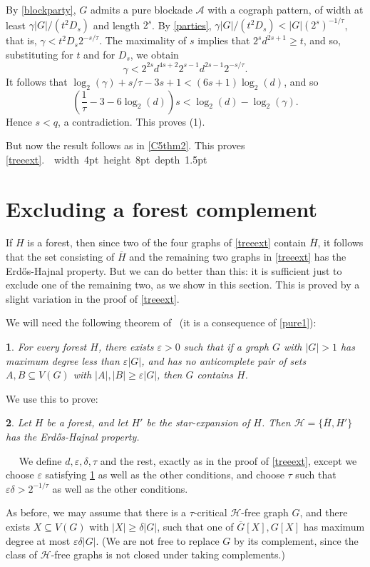 \documentclass[titlepage,11pt]{article}
\newcommand\blackslug{\hbox{\hskip 1pt \vrule width 4pt height 8pt depth 1.5pt
        \hskip 1pt}}
\newcommand\bbox{\hfill \quad \blackslug \bigbreak}
\newcommand{\vare}{\varepsilon}
\newtheorem{thm}{}[section]
\newcommand{\Proof}{\noindent{\bf Proof.}\ \ }
\begin{document}
By \ref{blockparty}, 
$G$ admits a pure blockade $\mathcal{A}$ with a cograph pattern, of width at least $\gamma|G|/(t^2D_s)$ and length $2^s$.
By \ref{parties}, 
$\gamma|G|/(t^2D_s) < |G|(2^{s})^{-1/\tau}$, that is,
$\gamma<t^2D_s2^{-s/\tau}$. The maximality of $s$ implies that $2^{s}d^{2s+1}\ge t$, and so,
substituting for $t$ and for $D_s$, 
we obtain
$$\gamma<2^{2s}d^{4s+2}2^{s-1}d^{2s-1}2^{-s/\tau}.$$
It follows that $\log_2(\gamma) + s/\tau-3s+1<(6s+1)\log_2(d)$,
and so
$$\left(\frac{1}{\tau}-3-6\log_2(d)\right)s<\log_2(d)-\log_2(\gamma).$$
Hence $s<q$, a contradiction.
This proves (1).

\bigskip

But now the result follows as in \ref{C5thm2}.
This proves \ref{treeext}.~\bbox


\section{Excluding a forest complement}

If $H$ is a forest, then since two of the four graphs of \ref{treeext} contain $\overline{H}$, it follows that the set
consisting of $\overline{H}$ and
the remaining two graphs in \ref{treeext} has the Erd\H os-Hajnal property. But we can do better than this: it is sufficient just to exclude
one of the remaining two, as we show in this section. This is proved by
a slight variation in the proof of \ref{treeext}.

We will need the following theorem of~\cite{pure1} (it is a consequence of \ref{pure1}):
\begin{thm}\label{pure1weak}
For every forest $H$, there exists $\vare>0$ such that if a graph $G$ with $|G|>1$ has maximum degree less than $\vare|G|$, and has
no anticomplete pair of sets $A,B\subseteq V(G)$ with $|A|,|B|\ge \vare|G|$, then $G$ contains $H$.
\end{thm}

We use this to prove:
\begin{thm}\label{antiforest}
Let $H$ be a forest, and let $H'$ be the star-expansion of $H$. Then $\mathcal{H}=\{\overline{H}, H'\}$
has the Erd\H os-Hajnal property.
\end{thm}
\Proof
We define $d,\vare,\delta,\tau$ and the rest, exactly as in the proof of \ref{treeext}, except we choose $\vare$ satisfying
\ref{pure1weak} as well as the other conditions, and choose $\tau$ such that  $\vare\delta>2^{-1/\tau}$ as well as the 
other conditions.

As before, we may assume that there is a $\tau$-critical $\mathcal{H}$-free graph $G$,
and there exists $X\subseteq V(G)$
with $|X|\ge \delta|G|$, such that one of $\overline{G}[X],G[X]$ has maximum degree at most $\vare\delta|G|$. (We are not free to replace $G$ by its complement, since the class of $\mathcal{H}$-free graphs is not closed under taking complements.)
\end{document}
